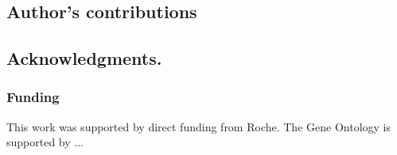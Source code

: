 \documentclass[runningheads,a4paper]{llncs}
\begin{document}
{{\subsection*{Author's contributions}


\subsection*{Acknowledgments.}

\subsubsection*{Funding}

This work was supported by direct funding from Roche.  The Gene Ontology is supported by ...










}}
\end{document}
